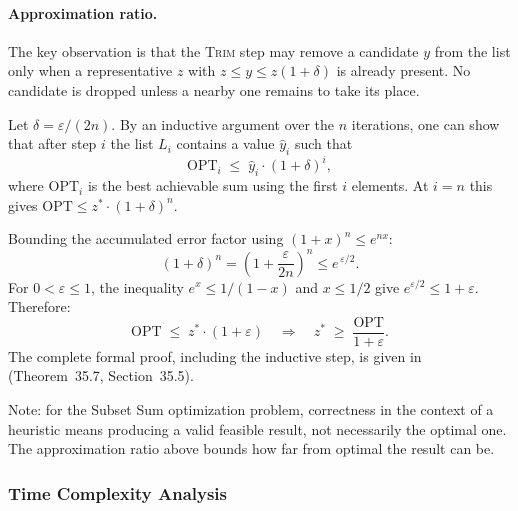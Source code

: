 \documentclass[12pt,a4paper]{article}
\theoremstyle{definition}
\begin{document}
\paragraph{Approximation ratio.}
The key observation is that the \textsc{Trim} step may remove a candidate $y$ from the
list only when a representative $z$ with $z \leq y \leq z(1+\delta)$ is already
present. No candidate is dropped unless a nearby one remains to take its place.

Let $\delta = \varepsilon / (2n)$. By an inductive argument over the $n$ iterations,
one can show that after step $i$ the list $L_i$ contains a value $\hat{y}_i$ such that
\[
  \mathrm{OPT}_i \;\leq\; \hat{y}_i \cdot (1+\delta)^i,
\]
where $\mathrm{OPT}_i$ is the best achievable sum using the first $i$ elements.
At $i = n$ this gives $\mathrm{OPT} \leq z^* \cdot (1+\delta)^n$.

Bounding the accumulated error factor using $(1 + x)^n \leq e^{nx}$:
\[
  (1+\delta)^n
    = \!\left(1 + \frac{\varepsilon}{2n}\right)^{\!n}
    \leq e^{\,\varepsilon/2}.
\]
For $0 < \varepsilon \leq 1$, the inequality $e^x \leq 1/(1-x)$ and $x \leq 1/2$ give
$e^{\varepsilon/2} \leq 1 + \varepsilon$. Therefore:
\[
  \mathrm{OPT} \;\leq\; z^* \cdot (1+\varepsilon)
  \quad\Longrightarrow\quad
  z^* \;\geq\; \frac{\mathrm{OPT}}{1+\varepsilon}.
\]
The complete formal proof, including the inductive step, is given in~\cite{clrs}
(Theorem~35.7, Section~35.5).

Note: for the Subset Sum optimization problem, correctness in the context of a
heuristic means producing a valid feasible result, not necessarily the optimal one.
The approximation ratio above bounds how far from optimal the result can be.

\subsubsection{Time Complexity Analysis}
\end{document}
